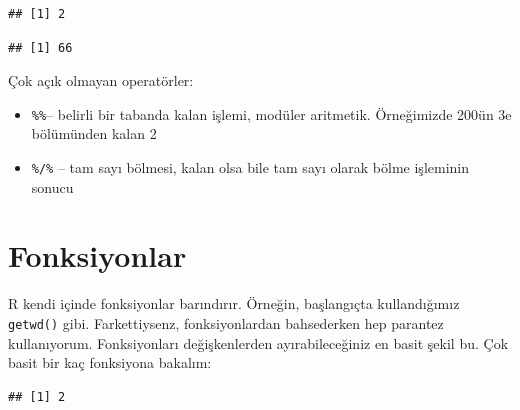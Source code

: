 \documentclass[]{book}
\newenvironment{Shaded}{\begin{snugshade}}{\end{snugshade}}
\newcommand{\CommentTok}[1]{\textcolor[rgb]{0.56,0.35,0.01}{\textit{#1}}}
\newcommand{\DecValTok}[1]{\textcolor[rgb]{0.00,0.00,0.81}{#1}}
\newcommand{\KeywordTok}[1]{\textcolor[rgb]{0.13,0.29,0.53}{\textbf{#1}}}
\newcommand{\NormalTok}[1]{#1}
\newcommand{\OperatorTok}[1]{\textcolor[rgb]{0.81,0.36,0.00}{\textbf{#1}}}
\providecommand{\tightlist}{%
  \setlength{\itemsep}{0pt}\setlength{\parskip}{0pt}}
\begin{document}
\begin{verbatim}
## [1] 2
\end{verbatim}

\begin{Shaded}
\end{Shaded}

\begin{verbatim}
## [1] 66
\end{verbatim}

Çok açık olmayan operatörler:

\begin{itemize}
\tightlist
\item
  \texttt{\%\%}-- belirli bir tabanda kalan işlemi, modüler aritmetik.
  Örneğimizde 200ün 3e bölümünden kalan 2
\item
  \texttt{\%/\%} -- tam sayı bölmesi, kalan olsa bile tam sayı olarak
  bölme işleminin sonucu
\end{itemize}

\hypertarget{fonksiyonlar}{%
\section{Fonksiyonlar}\label{fonksiyonlar}}

R kendi içinde fonksiyonlar barındırır. Örneğin, başlangıçta
kullandığımız \texttt{getwd()} gibi. Farkettiysenz, fonksiyonlardan
bahsederken hep parantez kullanıyorum. Fonksiyonları değişkenlerden
ayırabileceğiniz en basit şekil bu. Çok basit bir kaç fonksiyona
bakalım:

\begin{Shaded}
\end{Shaded}

\begin{verbatim}
## [1] 2
\end{verbatim}

\begin{Shaded}
\end{Shaded}
\end{document}
